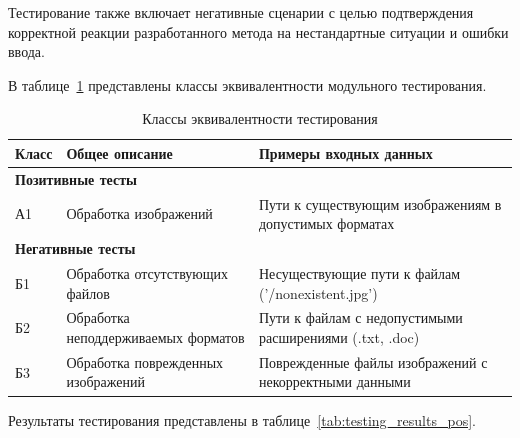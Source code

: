 Тестирование также включает негативные сценарии с целью подтверждения корректной реакции разработанного метода на нестандартные ситуации и ошибки ввода.

В таблице~\ref{tab:test_classes} представлены классы эквивалентности модульного тестирования.

\begin{table}[H]
    \centering
    \captionsetup{justification=raggedleft}
    \caption{Классы эквивалентности тестирования}
    \label{tab:test_classes}
    \begin{tabular}{|p{1.3cm}|p{5.8cm}|p{8.2cm}|}
        \hline
        \textbf{Класс} & \textbf{Общее описание} & \textbf{Примеры входных данных} \\
        \hline
        \multicolumn{3}{|l|}{\textbf{Позитивные тесты}} \\
        \hline
        А1 & Обработка изображений & Пути к существующим изображениям в допустимых форматах \\
        \hline
        \multicolumn{3}{|l|}{\textbf{Негативные тесты}} \\
        \hline
        Б1 & Обработка отсутствующих файлов & Несуществующие пути к файлам ('/nonexistent.jpg') \\
        \hline
        Б2 & Обработка неподдерживаемых форматов & Пути к файлам с недопустимыми расширениями (.txt, .doc) \\
        \hline
        Б3 & Обработка поврежденных изображений & Поврежденные файлы изображений с некорректными данными \\
        \hline
    \end{tabular}
\end{table}

Результаты тестирования представлены в таблице~\ref{tab:testing_results_pos}.

